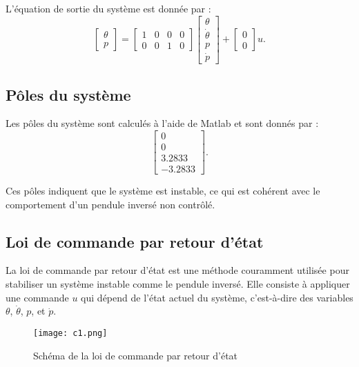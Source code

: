 \documentclass{report}
\begin{document}
L'équation de sortie du système est donnée par :
\[
\begin{bmatrix}
\theta \\
p
\end{bmatrix}
=
\begin{bmatrix}
1 & 0 & 0 & 0 \\
0 & 0 & 1 & 0
\end{bmatrix}
\begin{bmatrix}
\theta \\
\dot{\theta} \\
p \\
\dot{p}
\end{bmatrix}
+
\begin{bmatrix}
0 \\
0
\end{bmatrix}
u.
\]

\subsection{Pôles du système}

Les pôles du système sont calculés à l'aide de Matlab et sont donnés par :
\[
\begin{bmatrix}
0 \\
0 \\
3.2833 \\
-3.2833
\end{bmatrix}.
\]

Ces pôles indiquent que le système est instable, ce qui est cohérent avec le comportement d'un pendule inversé non contrôlé.

\newpage %

\subsection{Loi de commande par retour d'état}

La loi de commande par retour d'état est une méthode couramment utilisée pour stabiliser un système instable comme le pendule inversé. Elle consiste à appliquer une commande \( u \) qui dépend de l'état actuel du système, c'est-à-dire des variables \( \theta \), \( \dot{\theta} \), \( p \), et \( \dot{p} \).

\begin{figure}[h!]
    \centering
    \texttt{[image: c1.png]} %
    \caption{Schéma de la loi de commande par retour d'état}
    \label{fig:c1}
\end{figure}
\end{document}
